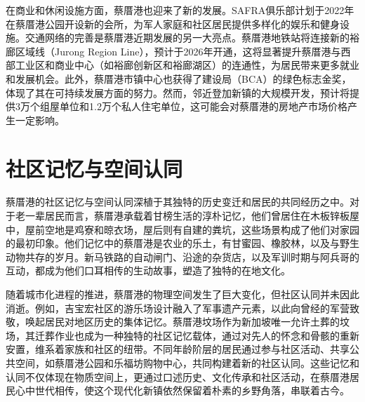 \documentclass[11pt,a4paper,twoside,openany]{book}
\begin{document}
在商业和休闲设施方面，蔡厝港也迎来了新的发展。SAFRA俱乐部计划于2022年在蔡厝港公园开设新的会所，为军人家庭和社区居民提供多样化的娱乐和健身设施。交通网络的完善是蔡厝港近期发展的另一大亮点。蔡厝港地铁站将连接新的裕廊区域线（Jurong Region Line），预计于2026年开通，这将显著提升蔡厝港与西部工业区和商业中心（如裕廊创新区和裕廊湖区）的连通性，为居民带来更多就业和发展机会。此外，蔡厝港市镇中心也获得了建设局（BCA）的绿色标志金奖，体现了其在可持续发展方面的努力。然而，邻近登加新镇的大规模开发，预计将提供3万个组屋单位和1.2万个私人住宅单位，这可能会对蔡厝港的房地产市场价格产生一定影响。

\section{社区记忆与空间认同}
蔡厝港的社区记忆与空间认同深植于其独特的历史变迁和居民的共同经历之中。对于老一辈居民而言，蔡厝港承载着甘榜生活的淳朴记忆，他们曾居住在木板锌板屋中，屋前空地是鸡寮和晾衣场，屋后则有自建的粪坑，这些场景构成了他们对家园的最初印象。他们记忆中的蔡厝港是农业的乐土，有甘蜜园、橡胶林，以及与野生动物共存的岁月。新马铁路的自动闸门、沿途的杂货店，以及军训时期与阿兵哥的互动，都成为他们口耳相传的生动故事，塑造了独特的在地文化。

随着城市化进程的推进，蔡厝港的物理空间发生了巨大变化，但社区认同并未因此消逝。例如，吉宝宏社区的游乐场设计融入了军事遗产元素，以此向曾经的军营致敬，唤起居民对地区历史的集体记忆。蔡厝港坟场作为新加坡唯一允许土葬的坟场，其迁葬作业也成为一种独特的社区记忆载体，通过对先人的怀念和骨骸的重新安置，维系着家族和社区的纽带。不同年龄阶层的居民通过参与社区活动、共享公共空间，如蔡厝港公园和乐福坊购物中心，共同构建着新的社区认同。这些记忆和认同不仅体现在物质空间上，更通过口述历史、文化传承和社区活动，在蔡厝港居民心中世代相传，使这个现代化新镇依然保留着朴素的乡野角落，串联着古今。
\end{document}
